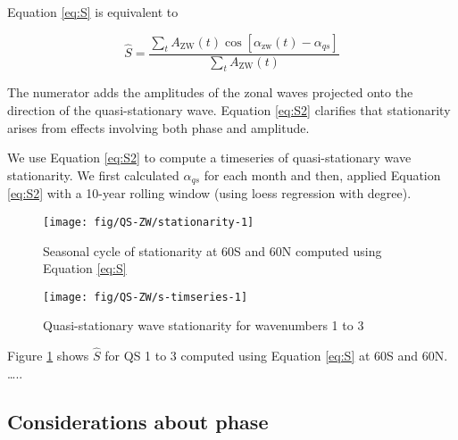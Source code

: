 \documentclass[draft,linenumbers]{agujournal2018}
\begin{document}
Equation \ref{eq:S} is equivalent to

\begin{linenomath*}
\begin{equation}\label{eq:S2}
\hat{S} =   \frac{\sum_t A_\mathrm{ZW}(t) \cos  \left [\alpha_\mathrm{zw}(t) - \alpha_{qs} \right ]}{\sum_t A_\mathrm{ZW}(t)}
\end{equation}
\end{linenomath*}

The numerator adds the amplitudes of the zonal waves projected onto the
direction of the quasi-stationary wave. Equation \ref{eq:S2} clarifies
that stationarity arises from effects involving both phase and
amplitude.

We use Equation \ref{eq:S2} to compute a timeseries of quasi-stationary
wave stationarity. We first calculated \(\alpha_{qs}\) for each month
and then, applied Equation \ref{eq:S2} with a 10-year rolling window
(using loess regression with degree).

\begin{figure}[h]

{\centering \texttt{[image: fig/QS-ZW/stationarity-1]} 

}

\caption{Seasonal cycle of stationarity at 60\degree S and 60\degree N computed using Equation \ref{eq:S}}\label{fig:stationarity}
\end{figure}

\begin{figure}[h]

{\centering \texttt{[image: fig/QS-ZW/s-timseries-1]} 

}

\caption{Quasi-stationary wave stationarity for wavenumbers 1 to 3 }\label{fig:s-timseries}
\end{figure}

Figure \ref{fig:stationarity} shows \(\hat{S}\) for QS 1 to 3 computed
using Equation \ref{eq:S} at 60\degree S and 60\degree N. \ldots{}..

\subsection{Considerations about phase}

\label{sec:phase}
\end{document}
